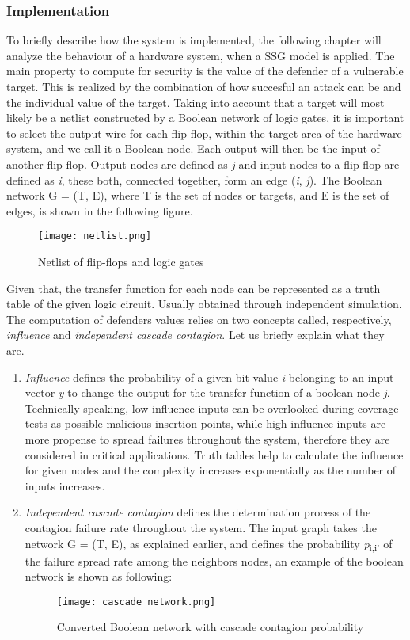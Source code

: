 \documentclass[conference]{IEEEtran}
\begin{document}
\subsubsection{Implementation}
To briefly describe how the system is implemented, the following chapter will analyze the behaviour of a hardware system, when a SSG model is applied.
The main property to compute for security is the value of the defender of a vulnerable target. This is realized by the combination of how succesful an attack can be and the individual value of the target. Taking into account that a target will most likely be a netlist constructed by a Boolean network of logic gates, it is important to select the output wire for each flip-flop, within the target area of the hardware system, and we call it a Boolean node. Each output will then be the input of another flip-flop. Output nodes are defined as \textit{j} and input nodes to a flip-flop are defined as \textit{i}, these both, connected together, form an edge (\textit{i}, \textit{j}). The Boolean network G = (T, E), where T is the set of nodes or targets, and E is the set of edges, is shown in the following figure.
\begin{figure}[h]
    \centerline{\texttt{[image: netlist.png]}}
    \caption{Netlist of flip-flops and logic gates}
    \label{netlist}
\end{figure} 

Given that, the transfer function for each node can be represented as a truth table of the given logic circuit. Usually obtained through independent simulation. The computation of defenders values relies on two concepts called, respectively, \textit{influence} and \textit{independent cascade contagion}. Let us briefly explain what they are.
\begin{enumerate}
\item \textit{Influence} defines the probability of a given bit value \textit{i} belonging to an input vector \textit{y} to change the output  for the transfer function of a boolean node \textit{j}. Technically speaking, low influence inputs can be overlooked during coverage tests as possible malicious insertion points, while high influence inputs are more propense to spread failures throughout the system, therefore they are considered in critical applications. Truth tables help to calculate the influence for given nodes and the complexity increases exponentially as the number of inputs increases.
\item \textit{Independent cascade contagion} defines the determination process of the contagion failure rate throughout the system. The input graph takes the network G = (T, E), as explained earlier, and defines the probability \textit{p}\textsubscript{i,i'} of the failure spread rate among the neighbors nodes, an example of the boolean network is shown as following:
\begin{figure}[h]
    \centerline{\texttt{[image: cascade network.png]}}
    \caption{Converted Boolean network with cascade contagion probability}
    \label{cascade}
\end{figure} 

\end{enumerate}
\end{document}
